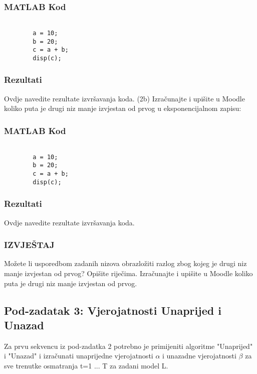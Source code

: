 \documentclass[12pt]{article}
\begin{document}
	\subsubsection*{MATLAB Kod}
	\begin{lstlisting}
		
		a = 10;
		b = 20;
		c = a + b;
		disp(c);
	\end{lstlisting}
	
	\subsubsection*{Rezultati}
	Ovdje navedite rezultate izvršavanja koda.\newline
	\newline
	(2b) Izračunajte i upišite u Moodle koliko puta je drugi niz manje izvjestan od prvog u eksponencijalnom zapisu:
	
	\subsubsection*{MATLAB Kod}
	\begin{lstlisting}
		
		a = 10;
		b = 20;
		c = a + b;
		disp(c);
	\end{lstlisting}
	
	\subsubsection*{Rezultati}
	Ovdje navedite rezultate izvršavanja koda.
	
	\subsubsection*{IZVJEŠTAJ}
	Možete li usporedbom zadanih nizova obrazložiti razlog zbog kojeg je drugi niz manje izvjestan od prvog? Opišite riječima.
	Izračunajte i upišite u Moodle koliko puta je drugi niz manje izvjestan od prvog.
	
	\subsection{Pod-zadatak 3: Vjerojatnosti Unaprijed i Unazad}
	Za prvu sekvencu iz pod-zadatka 2 potrebno je primijeniti algoritme "Unaprijed" i "Unazad" i izračunati unaprijedne vjerojatnosti $\alpha$ i unazadne vjerojatnosti $\beta$ za sve trenutke osmatranja t=1 ... T za zadani model L.
	
\end{document}
